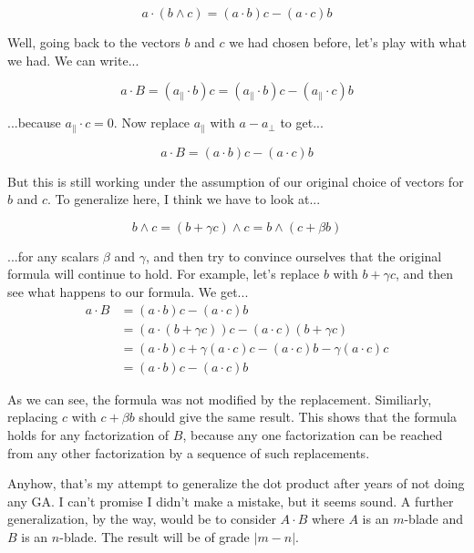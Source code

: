 \documentclass[12pt]{article}
\begin{document}
\begin{equation*}
  a\cdot (b\wedge c) = (a\cdot b)c - (a\cdot c)b
\end{equation*}
  
Well, going back to the vectors $b$ and $c$ we had chosen before, let's play with what we had.  We can write...

\begin{equation*}
  a\cdot B = (a_{\parallel}\cdot b)c = (a_{\parallel}\cdot b)c - (a_{\parallel}\cdot c)b
\end{equation*}
  
...because $a_{\parallel}\cdot c=0$.  Now replace $a_{\parallel}$ with $a-a_{\bot}$ to get...

\begin{equation*}
  a\cdot B = (a\cdot b)c - (a\cdot c)b
\end{equation*}
  
But this is still working under the assumption of our original choice of vectors for $b$ and $c$.  To generalize here, I think we have to look at...

\begin{equation*}
  b\wedge c = (b + \gamma c)\wedge c = b\wedge (c + \beta b)
\end{equation*}
  
...for any scalars $\beta$ and $\gamma$, and then try to convince ourselves that the original formula will continue to hold.  For example, let's replace $b$ with $b + \gamma c$, and then see what happens to our formula.  We get...
\begin{align*}
a\cdot B &= (a\cdot b)c - (a\cdot c)b \\
 &= (a\cdot(b + \gamma c))c - (a\cdot c)(b + \gamma c) \\
 &= (a\cdot b)c + \gamma(a\cdot c)c - (a\cdot c)b - \gamma (a\cdot c)c \\
 &= (a\cdot b)c - (a\cdot c)b
\end{align*}

As we can see, the formula was not modified by the replacement.  Similiarly, replacing $c$ with $c + \beta b$ should give the same result.  This shows that the formula holds for any factorization of $B$, because any one factorization can be reached from any other factorization by a sequence of such replacements.

Anyhow, that's my attempt to generalize the dot product after years of not doing any GA.  I can't promise I didn't make a mistake, but it seems sound.  A further generalization, by the way, would be to consider $A\cdot B$ where $A$ is an $m$-blade and $B$ is an $n$-blade.  The result will be of grade $|m-n|$.
\end{document}
